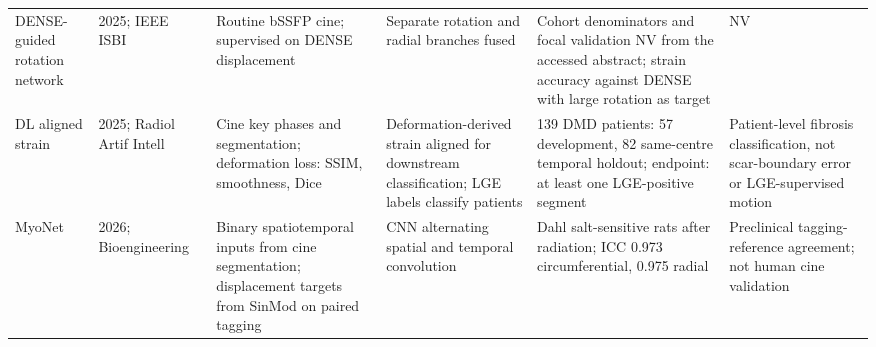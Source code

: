 \documentclass[11pt,a4paper]{article}
\begin{document}
{\begin{longtable}{L{0.107\textwidth}L{0.111\textwidth}L{0.155\textwidth}L{0.179\textwidth}L{0.199\textwidth}L{0.16\textwidth}}
\addlinespace
DENSE-guided rotation network & 2025; IEEE ISBI~\cite{lei2025denserotation} & Routine bSSFP cine; supervised on DENSE displacement & Separate rotation and radial branches fused & Cohort denominators and focal validation NV from the accessed abstract; strain accuracy against DENSE with large rotation as target & NV \\
\addlinespace
DL aligned strain & 2025; Radiol Artif Intell~\cite{koehler2025alignedstrain} & Cine key phases and segmentation; deformation loss: SSIM, smoothness, Dice & Deformation-derived strain aligned for downstream classification; LGE labels classify patients & 139 DMD patients: 57 development, 82 same-centre temporal holdout; endpoint: at least one LGE-positive segment & Patient-level fibrosis classification, not scar-boundary error or LGE-supervised motion \\
\addlinespace
MyoNet & 2026; Bio\-engineering~\cite{an2026myonet} & Binary spatiotemporal inputs from cine segmentation; displacement targets from SinMod on paired tagging & CNN alternating spatial and temporal convolution & Dahl salt-sensitive rats after radiation; ICC 0.973 circumferential, 0.975 radial & Preclinical tagging-reference agreement; not human cine validation \\
\bottomrule
\end{longtable}
}



\end{document}
